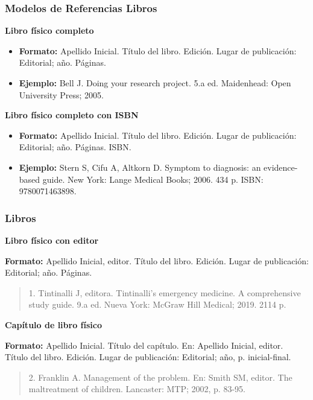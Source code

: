\documentclass[
11pt, %
]{beamer}
\begin{document}
\begin{frame}
	\frametitle{Modelos de Referencias Libros}

	\textbf{Libro físico completo}
	\begin{itemize}
		\item \textbf{Formato:} Apellido Inicial. Título del libro. Edición. Lugar de publicación: Editorial; año. Páginas.
		\item \textbf{Ejemplo:} Bell J. Doing your research project. 5.a ed. Maidenhead: Open University Press; 2005.
	\end{itemize}

	\textbf{Libro físico completo con ISBN}
	\begin{itemize}
		\item \textbf{Formato:} Apellido Inicial. Título del libro. Edición. Lugar de publicación: Editorial; año. Páginas. ISBN.
		\item \textbf{Ejemplo:} Stern S, Cifu A, Altkorn D. Symptom to diagnosis: an evidence-based guide. New York: Lange Medical Books; 2006. 434 p. ISBN: 9780071463898.
	\end{itemize}

\end{frame}

\begin{frame}
	\frametitle{Libros}

	\textbf{Libro físico con editor}

	\textbf{Formato:} Apellido Inicial, editor. Título del libro. Edición. Lugar de publicación: Editorial; año. Páginas.
	\begin{quote}
		1.  Tintinalli J, editora. Tintinalli’s emergency medicine. A comprehensive study guide. 9.a ed. Nueva York: McGraw Hill Medical; 2019. 2114 p.
	\end{quote}

	\textbf{Capítulo de libro físico}

	\textbf{Formato:} Apellido Inicial. Título del capítulo. En: Apellido Inicial, editor. Título del libro. Edición. Lugar de publicación: Editorial; año, p. inicial-final.

	\begin{quote}
		2.  Franklin A. Management of the problem. En: Smith SM, editor. The maltreatment of children. Lancaster: MTP; 2002, p. 83-95.
	\end{quote}


\end{frame}
\end{document}
